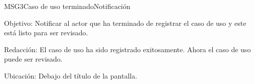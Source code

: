 \begin{mensaje}{MSG3}{Caso de uso terminado}{Notificación}
	\item [Objetivo:] Notificar al actor que ha terminado de registrar el caso de uso y este está listo para ser revisado.
	\item[Redacción:] El caso de uso ha sido registrado exitosamente. Ahora el caso de uso puede ser revisado.
	\item [Ubicación:] Debajo del título de la pantalla.
\end{mensaje}